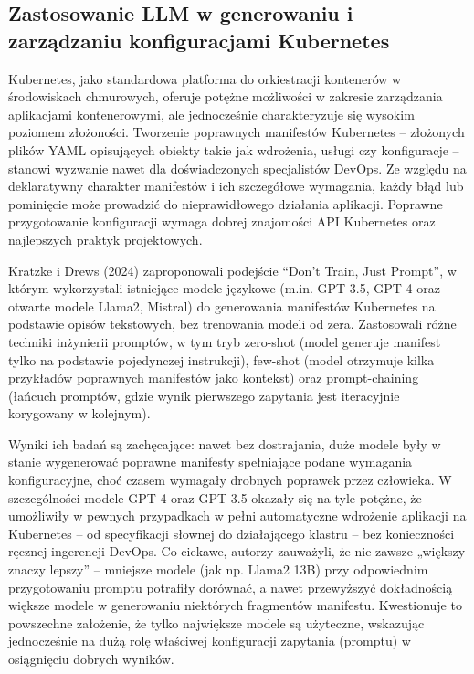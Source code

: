 \subsection{Zastosowanie LLM w generowaniu i zarządzaniu konfiguracjami Kubernetes}

Kubernetes, jako standardowa platforma do orkiestracji kontenerów w środowiskach chmurowych, oferuje potężne możliwości w zakresie zarządzania aplikacjami kontenerowymi, ale jednocześnie charakteryzuje się wysokim poziomem złożoności. Tworzenie poprawnych manifestów Kubernetes – złożonych plików YAML opisujących obiekty takie jak wdrożenia, usługi czy konfiguracje – stanowi wyzwanie nawet dla doświadczonych specjalistów DevOps. Ze względu na deklaratywny charakter manifestów i ich szczegółowe wymagania, każdy błąd lub pominięcie może prowadzić do nieprawidłowego działania aplikacji. Poprawne przygotowanie konfiguracji wymaga dobrej znajomości API Kubernetes oraz najlepszych praktyk projektowych.

Kratzke i Drews (2024) \cite{kratzke_dont_2024} zaproponowali podejście “Don’t Train, Just Prompt”, w którym wykorzystali istniejące modele językowe (m.in. GPT-3.5, GPT-4 oraz otwarte modele Llama2, Mistral) do generowania manifestów Kubernetes na podstawie opisów tekstowych, bez trenowania modeli od zera. Zastosowali różne techniki inżynierii promptów, w tym tryb zero-shot (model generuje manifest tylko na podstawie pojedynczej instrukcji), few-shot (model otrzymuje kilka przykładów poprawnych manifestów jako kontekst) oraz prompt-chaining (łańcuch promptów, gdzie wynik pierwszego zapytania jest iteracyjnie korygowany w kolejnym).

Wyniki ich badań są zachęcające: nawet bez dostrajania, duże modele były w stanie wygenerować poprawne manifesty spełniające podane wymagania konfiguracyjne, choć czasem wymagały drobnych poprawek przez człowieka. W szczególności modele GPT-4 oraz GPT-3.5 okazały się na tyle potężne, że umożliwiły w pewnych przypadkach w pełni automatyczne wdrożenie aplikacji na Kubernetes – od specyfikacji słownej do działającego klastru – bez konieczności ręcznej ingerencji DevOps. Co ciekawe, autorzy zauważyli, że nie zawsze „większy znaczy lepszy” – mniejsze modele (jak np. Llama2 13B) przy odpowiednim przygotowaniu promptu potrafiły dorównać, a nawet przewyższyć dokładnością większe modele w generowaniu niektórych fragmentów manifestu. Kwestionuje to powszechne założenie, że tylko największe modele są użyteczne, wskazując jednocześnie na dużą rolę właściwej konfiguracji zapytania (promptu) w osiągnięciu dobrych wyników.

